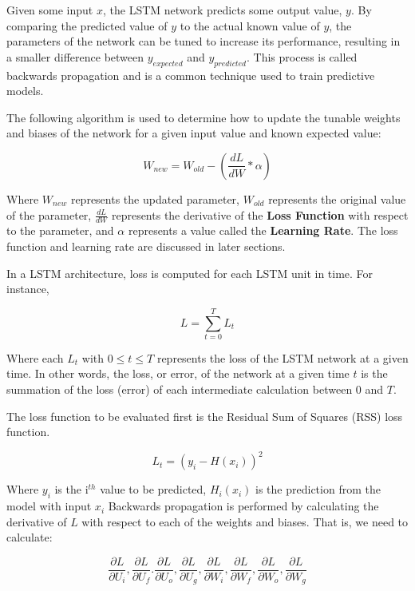 \documentclass[12pt]{article}
\begin{document}
Given some input $x$, the LSTM network predicts some output value, $y$. By
comparing the predicted value of $y$ to the actual known value of $y$, the
parameters of the network can be tuned to increase its performance, resulting
in a smaller difference between $y_{expected}$ and $y_{predicted}$. This
process is called backwards propagation and is a common technique used to train
predictive models.

The following algorithm is used to determine how to update the tunable weights
and biases of the network for a given input value and known expected value:

\begin{equation}
    \label{eqn:w_new}
    W_{new} = W_{old} - (\frac{dL}{dW} * \alpha)
\end{equation}

Where $W_{new}$ represents the updated parameter, $W_{old}$ represents the
original value of the parameter, $\frac{dL}{dW}$ represents the derivative of
the \textbf{Loss Function} with respect to the parameter, and $\alpha$
represents a value called the \textbf{Learning Rate}. The loss function and
learning rate are discussed in later sections.

In a LSTM architecture, loss is computed for each LSTM unit in time. For
instance,

\begin{equation}
    L = \sum_{t=0}^{T}L_t
\end{equation}

Where each $L_t$ with $0 \le t \le T$ represents the loss of the LSTM network
at a given time. In other words, the loss, or error, of the network at a given
time $t$ is the summation of the loss (error) of each intermediate calculation
between 0 and $T$.

The loss function to be evaluated first is the Residual Sum of Squares (RSS)
loss function.

\begin{equation}
    L_t = (y_i - H(x_i))^2
\end{equation}

Where $y_i$ is the i$^{th}$ value to be predicted, $H_i(x_i)$ is the prediction
from the model with input $x_i$ Backwards propagation is performed by
calculating the derivative of $L$ with respect to each of the weights and
biases. That is, we need to calculate:

\begin{equation*}
    \frac{\partial L}{\partial U_i}, \frac{\partial L}{\partial U_f}. \frac{\partial L}{\partial U_o}, \frac{\partial L}{\partial U_g}, \frac{\partial L}{\partial W_i}, \frac{\partial L}{\partial W_f}, \frac{\partial L}{\partial W_o}, \frac{\partial L}{\partial W_g}
\end{equation*}
\end{document}
